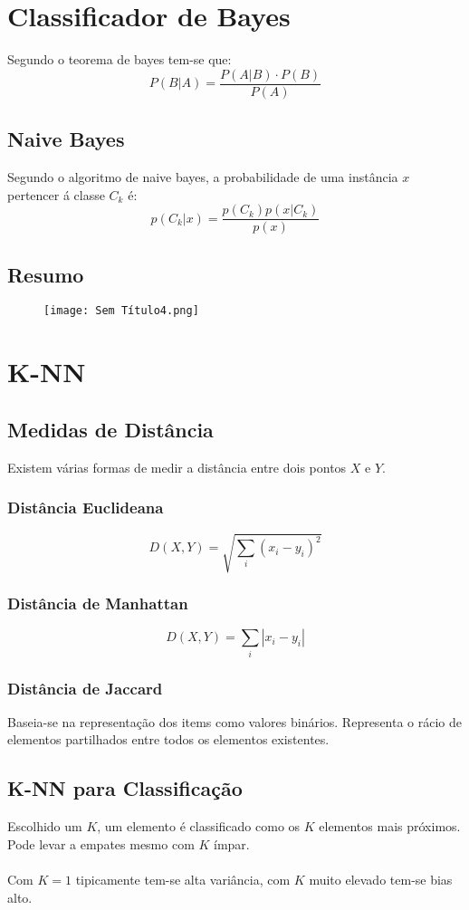 \documentclass[10pt,a4paper]{report}
\begin{document}
\section{Classificador de Bayes}
Segundo o teorema de bayes tem-se que:
$$
P(B|A) = \frac{P(A|B) \cdot P(B)}{P(A)}
$$
\subsection{Naive Bayes}
Segundo o algoritmo de naive bayes, a probabilidade de uma instância $x$ pertencer á classe $C_k$ é:
$$
p(C_k|x) = \frac{p(C_k)p(x|C_k)}{p(x)}
$$
\subsection{Resumo}
\begin{figure}[H]
\centering
\texttt{[image: Sem Título4.png]}
\end{figure}
\section{K-NN}
\subsection{Medidas de Distância}
Existem várias formas de medir a distância entre dois pontos $X$ e $Y$.
\subsubsection{Distância Euclideana}
$$
D(X,Y) = \sqrt{\sum_i (x_i - y_i)^2}
$$
\subsubsection{Distância de Manhattan}
$$
D(X,Y) = \sum_i |x_i - y_i|
$$
\subsubsection{Distância de Jaccard}
Baseia-se na representação dos items como valores binários. Representa o rácio de elementos partilhados entre todos os elementos existentes.
\subsection{K-NN para Classificação}
Escolhido um $K$, um elemento é classificado como os $K$ elementos mais próximos. Pode levar a empates mesmo com $K$ ímpar.\\
\\
Com $K=1$ tipicamente tem-se alta variância, com $K$ muito elevado tem-se bias alto.
\end{document}
